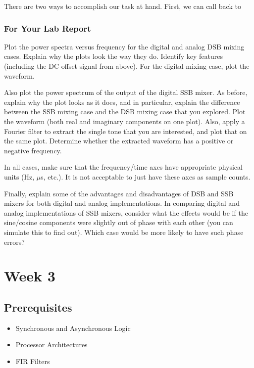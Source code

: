 \documentclass[11pt]{article}
\begin{document}
There are two ways to accomplish our task at hand. First, we can call back to

\subsubsection{For Your Lab Report}

        Plot the power spectra versus
frequency for the digital and analog DSB mixing cases. Explain why the plots look the way they do.  Identify
key features (including the DC offset signal from above).  For the digital mixing case, plot the waveform.

Also plot the power spectrum of the output of the digital SSB mixer.  As before, explain why the plot
looks as it does, and in particular, explain the difference between the SSB mixing case and the DSB mixing
case that you explored.  Plot the waveform (both real and imaginary components on one plot). Also, apply a
Fourier filter to extract the single tone that you are interested, and plot that on the same plot.
Determine
whether the extracted waveform has a positive or negative frequency.

In all cases, make sure that the frequency/time axes have appropriate physical units (Hz, $\mu$s, etc.).
It is not acceptable to just have these axes as sample counts.

Finally, explain some of the advantages and disadvantages of DSB and SSB mixers for both digital and
analog implementations.  In comparing digital and analog implementations of SSB mixers, consider what the effects would
be if the sine/cosine components were slightly out of phase with each other (you can simulate this to find out).  Which
case would be more likely to have such phase errors?

\section{Week 3}
\subsection*{Prerequisites}

\begin{itemize}[noitemsep,nolistsep]
\item Synchronous and Asynchronous Logic
\item Processor Architectures
\item FIR Filters
\end{itemize}
\end{document}
